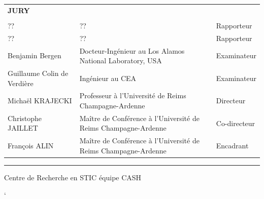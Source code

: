 \documentclass[10pt,a4paper]{book}
\begin{document}
{{\normalsize
\begin{tabular}{l l l}
\textbf{JURY} &  & \\
&&\\
?? & ?? & Rapporteur\\
?? & ?? & Rapporteur\\
Benjamin Bergen & Docteur-Ingénieur au Los Alamos National Laboratory, USA & Examinateur \\
Guillaume Colin de Verdière & Ingénieur au CEA & Examinateur\\
Michaël KRAJECKI & Professeur à l'Université de Reims Champagne-Ardenne & Directeur \\
Christophe JAILLET & Maître de Conférence à l'Université de Reims Champagne-Ardenne & Co-directeur \\
François ALIN & Maître de Conférence à l'Université de Reims Champagne-Ardenne & Encadrant \\
\end{tabular}

\vspace{0.5cm}

\hrule

\vspace{0.5cm}

Centre de Recherche en STIC équipe CASH

}

}%

\thispagestyle{empty}

\frontmatter



\tableofcontents

\listoffigures

\listoftables

\mainmatter






`




\nocite{*}

\end{document}
